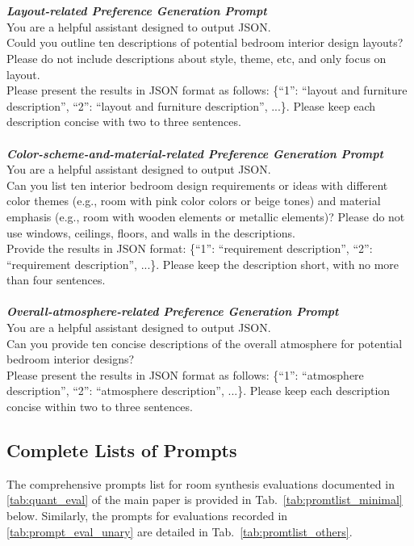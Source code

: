 \\\\
\noindent
\textit{\textbf{Layout-related Preference Generation Prompt}}\\
You are a helpful assistant designed to output JSON.\\
Could you outline ten descriptions of potential bedroom interior design layouts? Please do not include descriptions about style, theme, etc, and only focus on layout.\\
Please present the results in JSON format as follows: \{``1'': ``layout and furniture description'', ``2'': ``layout and furniture description'', ...\}. Please keep each description concise with two to three sentences.
\\\\
\noindent
\textit{\textbf{Color-scheme-and-material-related Preference Generation Prompt}}\\
You are a helpful assistant designed to output JSON.\\
Can you list ten interior bedroom design requirements or ideas with different color themes (e.g., room with pink color colors or beige tones) and material emphasis (e.g., room with wooden elements or metallic elements)? Please do not use windows, ceilings, floors, and walls in the descriptions. \\
Provide the results in JSON format: \{``1'': ``requirement description'', ``2'': ``requirement description'', ...\}. Please keep the description short, with no more than four sentences.
\\\\
\noindent
\textit{\textbf{Overall-atmosphere-related Preference Generation Prompt}}\\
You are a helpful assistant designed to output JSON.\\
Can you provide ten concise descriptions of the overall atmosphere for potential bedroom interior designs? \\
Please present the results in JSON format as follows: \{``1'': ``atmosphere description'', ``2'': ``atmosphere description'', ...\}. Please keep each description concise within two to three sentences.

\subsection{Complete Lists of Prompts}
The comprehensive prompts list for room synthesis evaluations documented in \cref{tab:quant_eval} of the main paper is provided in Tab.~\ref{tab:promtlist_minimal} below. Similarly, the prompts for evaluations recorded in \cref{tab:prompt_eval_unary} are detailed in Tab.~\ref{tab:promtlist_others}.

